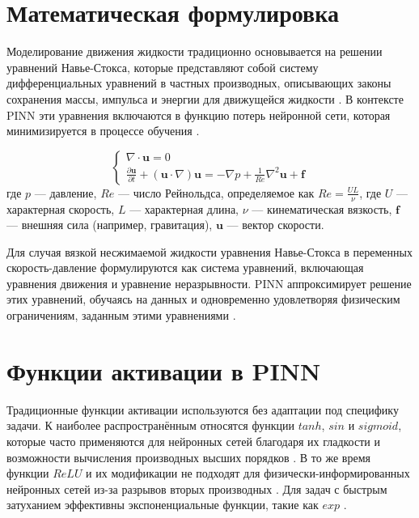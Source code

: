 \section{Математическая формулировка}
Моделирование движения жидкости традиционно основывается на решении уравнений Навье-Стокса, которые
представляют собой систему дифференциальных уравнений в частных производных, описывающих законы сохранения
массы, импульса и энергии для движущейся жидкости \cite{batchelor2000introduction}. В контексте PINN эти
уравнения включаются в функцию потерь нейронной сети, которая минимизируется в процессе
обучения \cite{yang2019adversarial}.

\begin{equation}
    \begin{cases}
    \nabla \cdot \mathbf{u} = 0 \\
    \frac{\partial \mathbf{u}}{\partial t} + (\mathbf{u} \cdot \nabla) \mathbf{u} = -\nabla p + \frac{1}{Re} \nabla^2 \mathbf{u} + \mathbf{f}
    \end{cases}
    \label{eq:navier_stockes}
\end{equation}
где $p$ — давление, $Re$ — число Рейнольдса, определяемое как $Re = \frac{UL}{\nu}$, где $U$ —
характерная скорость, $L$ — характерная длина, $\nu$ — кинематическая вязкость, $\mathbf{f}$ —
внешняя сила (например, гравитация), $\mathbf{u}$ — вектор скорости.

Для случая вязкой несжимаемой жидкости уравнения Навье-Стокса в переменных скорость-давление формулируются
как система уравнений, включающая уравнения движения и уравнение неразрывности. PINN аппроксимирует
решение этих уравнений, обучаясь на данных и одновременно удовлетворяя физическим ограничениям, заданным
этими уравнениями \cite{jin2021nsfnets}.

\section{Функции активации в PINN}

Традиционные функции активации используются без адаптации под специфику задачи. К наиболее распространённым
относятся функции $tanh$, $sin$ и $sigmoid$, которые часто применяются для нейронных сетей благодаря их гладкости
и возможности вычисления производных высших порядков \cite{0d752c79fb816703274a3d37f85a85689a2a9405}
\cite{Sutfeld2018-io}. В то же время функции $ReLU$ и их модификации не подходят для физически-информированных нейронных сетей из-за
разрывов вторых производных \cite{fe520ccac2a6bd50f75a4a34022fe54116871013}. Для задач с быстрым затуханием
эффективны экспоненциальные функции, такие как $exp$ \cite{7fcd4b3c875d8e41eb0c184aa1a42bf4c8906d61}.

